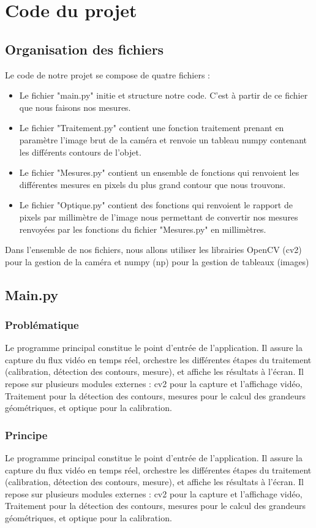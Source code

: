 \documentclass[titlepage]{article}
\begin{document}
	\section{Code du projet}
	\subsection{Organisation des fichiers}
		Le code de notre projet se compose de quatre fichiers :\\
		\begin{itemize}
			\item 
			Le fichier "main.py" initie et structure notre code. C'est à partir de ce fichier que nous faisons nos mesures.
			\item 
			Le fichier "Traitement.py" contient une fonction traitement prenant en paramètre l'image brut de la caméra et  renvoie un tableau numpy contenant les différents contours de l'objet. 
			\item 
			Le fichier "Mesures.py" contient un ensemble de fonctions qui renvoient les différentes mesures en pixels du plus grand contour que nous trouvons.
			\item 
			Le fichier "Optique.py" contient des fonctions qui renvoient le rapport de pixels par millimètre de l'image nous permettant de convertir nos mesures renvoyées par les fonctions du fichier "Mesures.py" en millimètres.\\[0.5cm]
		\end{itemize}
		\raggedright
		Dans l'ensemble de nos fichiers, nous allons utiliser les librairies OpenCV (cv2) pour la gestion de la caméra et numpy (np) pour la gestion de tableaux (images)
	
	\subsection{Main.py}
	\subsubsection{Problématique}
	Le programme principal constitue le point d'entrée de l'application. Il assure la capture du flux vidéo en temps réel, orchestre les différentes étapes du traitement (calibration, détection des contours, mesure), et affiche les résultats à l'écran. Il repose sur plusieurs modules externes : cv2 pour la capture et l'affichage vidéo, Traitement pour la détection des contours, mesures pour le calcul des grandeurs géométriques, et optique pour la calibration.
	\subsubsection{Principe}
	Le programme principal constitue le point d'entrée de l'application. Il assure la capture du flux vidéo en temps réel, orchestre les différentes étapes du traitement (calibration, détection des contours, mesure), et affiche les résultats à l'écran. Il repose sur plusieurs modules externes : cv2 pour la capture et l'affichage vidéo, Traitement pour la détection des contours, mesures pour le calcul des grandeurs géométriques, et optique pour la calibration.
\end{document}
